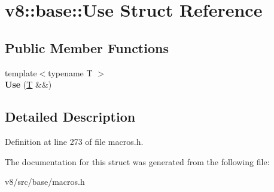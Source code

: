 \hypertarget{structv8_1_1base_1_1Use}{}\section{v8\+:\+:base\+:\+:Use Struct Reference}
\label{structv8_1_1base_1_1Use}
\subsection*{Public Member Functions}
\begin{DoxyCompactItemize}
\item 
\mbox{\label{structv8_1_1base_1_1Use_ad3d04e661dad24c98951adf5fd0fae0c}} 
{\footnotesize template$<$typename T $>$ }\\{\bfseries Use} (\mbox{\hyperlink{classv8_1_1internal_1_1torque_1_1T}{T}} \&\&)
\end{DoxyCompactItemize}


\subsection{Detailed Description}


Definition at line 273 of file macros.\+h.



The documentation for this struct was generated from the following file\+:\begin{DoxyCompactItemize}
\item 
v8/src/base/macros.\+h\end{DoxyCompactItemize}

